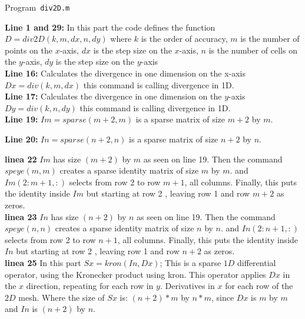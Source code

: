 \begin{octavelisting}
	\tiny
	\centering
	\caption{Program~\texttt{div2D.m}}
	\label{code:div2D.m}
\end{octavelisting}

\textbf{Line 1 and 29:} In this part the code defines the function $D = div2D(k, m, dx,n,dy)$ where $k$ is the order of accuracy, $m$ is the number of points on the $x$-axis, $dx$ is the step size on the $x$-axis, $n$ is the number of cells on the $y$-axis, $dy$ is the step size on the $y$-axis\\

\textbf{Line 16:} Calculates the divergence in one dimension on the x-axis $Dx = div(k, m, dx)$ this command is calling divergence in 1D. \\

\textbf{Line 17:} Calculates the divergence in one dimension on the $y$-axis $Dy = div(k, n, dy)$ this command is calling divergence in 1D. \\

\textbf{Line 19:} $Im = sparse(m+2,m)$ is a sparse matrix of size $m+2$ by $m$.

\textbf{Line 20:} $In = sparse(n+2,n)$ is a sparse matrix of size $n+2$ by $n$.

\textbf{linea 22} $Im$ has size $(m+2)$ by $m$ as seen on line 19. Then the command $speye(m, m)$ creates a sparse identity matrix of size $m$ by $m$. and $Im(2:m+1, :)$ selects from row 2 to row $m+1$, all columns. Finally, this puts the identity inside $Im$ but starting at row 2 , leaving row 1 and row $m+2$ as zeros.\\

\textbf{linea 23} $In$ has size $(n+2)$ by $n$ as seen on line 19. Then the command $speye(n, n)$ creates a sparse identity matrix of size $n$ by $n$. and $In(2:n+1, :)$ selects from row 2 to row $n+1$, all columns. Finally, this puts the identity inside $In$ but starting at row 2 , leaving row 1 and row $n+2$ as zeros.\\

\textbf{linea 25} In this part $Sx = kron(In, Dx)$; This is a sparse $1D$ differential operator, using the Kronecker product using kron. This operator applies $Dx$ in the $x$ direction, repeating for each row in $y$. Derivatives in $x$ for each row of the $2D$ mesh. Where the size of $Sx$ is: $(n+2)*m$ by $n*m$, since $Dx$ is $m$ by $m$ and $In$ is $(n+2)$ by $n$.\\


